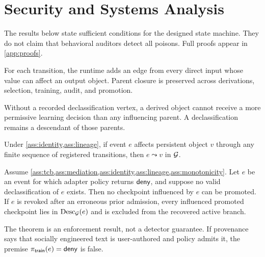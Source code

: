 \section{Security and Systems Analysis}
\label{sec:theory}

The results below state sufficient conditions for the designed state machine. They do not claim that behavioral auditors detect all poisons. Full proofs appear in \cref{app:proofs}.

\begin{assumption}
\label{ass:lineage}
For each transition, the runtime adds an edge from every direct input whose value can affect an output object. Parent closure is preserved across derivations, selection, training, audit, and promotion.
\end{assumption}

\begin{assumption}
\label{ass:monotonicity}
Without a recorded declassification vertex, a derived object cannot receive a more permissive learning decision than any influencing parent. A declassification remains a descendant of those parents.
\end{assumption}

\begin{lemma}
\label{lem:closure}
Under \cref{ass:identity,ass:lineage}, if event $e$ affects persistent object $v$ through any finite sequence of registered transitions, then $e\leadsto v$ in $\mathcal{G}$.
\end{lemma}

\begin{theorem}
\label{thm:nonlaundering}
Assume \cref{ass:tcb,ass:mediation,ass:identity,ass:lineage,ass:monotonicity}. Let $e$ be an event for which adapter policy returns $\mathsf{deny}$, and suppose no valid declassification of $e$ exists. Then no checkpoint influenced by $e$ can be promoted. If $e$ is revoked after an erroneous prior admission, every influenced promoted checkpoint lies in $\operatorname{Desc}_{\mathcal{G}}(e)$ and is excluded from the recovered active branch.
\end{theorem}

\begin{remark}
The theorem is an enforcement result, not a detector guarantee. If provenance says that socially engineered text is user-authored and policy admits it, the premise $\pi_{\mathsf{train}}(e)=\mathsf{deny}$ is false.
\end{remark}

